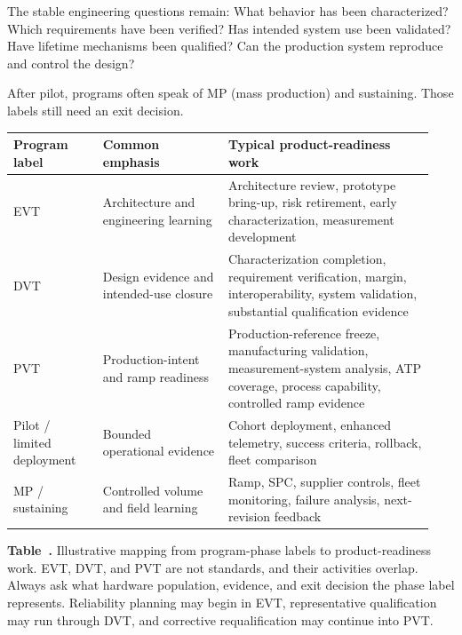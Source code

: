 The stable engineering questions remain: What behavior has been characterized?
Which requirements have been verified? Has intended system use been validated?
Have lifetime mechanisms been qualified? Can the production system reproduce
and control the design?

After pilot, programs often speak of
MP
(mass production) and sustaining. Those labels still need an exit decision.

\begin{table}[ht]
\label{tab:phase-readiness-map}%
\centering
\setlength{\tabcolsep}{3pt}%
\footnotesize
\renewcommand{\arraystretch}{1.15}%
\begin{tabular}{@{}p{0.20\linewidth}p{0.28\linewidth}p{0.46\linewidth}@{}}
\toprule
Program label & Common emphasis & Typical product-readiness work \\
\midrule
EVT & Architecture and engineering learning & Architecture review, prototype
bring-up, risk retirement, early characterization, measurement development \\
\addlinespace[0.6em]
DVT & Design evidence and intended-use closure & Characterization completion,
requirement verification, margin, interoperability, system validation,
substantial qualification evidence \\
\addlinespace[0.6em]
PVT & Production-intent and ramp readiness & Production-reference freeze,
manufacturing validation, measurement-system analysis, ATP coverage, process
capability, controlled ramp evidence \\
\addlinespace[0.6em]
Pilot / limited deployment & Bounded operational evidence & Cohort deployment,
enhanced telemetry, success criteria, rollback, fleet comparison \\
\addlinespace[0.6em]
MP / sustaining & Controlled volume and field learning & Ramp, SPC, supplier
controls, fleet monitoring, failure analysis, next-revision feedback \\
\bottomrule
\end{tabular}
\par\medskip
{\raggedright\footnotesize\textbf{Table~\thetable.} Illustrative mapping from
program-phase labels to product-readiness work. EVT, DVT, and PVT are not
standards, and their activities overlap. Always ask what hardware population,
evidence, and exit decision the phase label represents. Reliability planning
may begin in EVT, representative qualification may run through DVT, and
corrective requalification may continue into PVT.\par}
\end{table}

